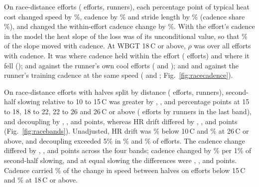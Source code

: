 \documentclass[12pt]{article}
\newcommand{\degC}{\,\textdegree C}
\begin{document}
On race-distance efforts (\raceWithinN{} efforts, \raceWithinRunners{} runners), each percentage point of typical heat cost changed speed by \raceSpeed\%, cadence by \raceCad\% and stride length by \raceStride\% (cadence share \raceCadShare\%), and changed the within-effort cadence change by \raceCadDrift\%. With the effort's cadence in the model the heat slope of the loss was \raceCondSlope{} of its unconditional value, so that \raceCondShare\% of the slope moved with cadence. At WBGT 18\degC{} or above, $\rho$ was \rhoAll{} over all \rhoAllN{} efforts with cadence. It was \rhoRaceHeld{} where cadence held within the effort (\rhoRaceHeldN{} efforts) and \rhoRaceFell{} where it fell (\rhoRaceFellN); \rhoCoolHeld{} and \rhoCoolDown{} against the runner's own cool efforts (\rhoCoolHeldN{} and \rhoCoolDownN); and \rhoTrainHeld{} and \rhoTrainDown{} against the runner's training cadence at the same speed (\rhoTrainHeldN{} and \rhoTrainDownN; Fig.~\ref{fig:racecadence}).

On race-distance efforts with halves split by distance (\raceBandN{} efforts, \raceBandRunners{} runners), second-half slowing relative to 10 to 15\degC{} was greater by \raceBandSlowMild, \raceBandSlowWarm, \raceBandSlowHot{} and \raceBandSlowSevere{} percentage points at 15 to 18, 18 to 22, 22 to 26 and 26\degC{} or above (\raceBandSevereN{} efforts by \raceBandSevereRunners{} runners in the last band), and decoupling by \raceBandDecMild, \raceBandDecWarm, \raceBandDecHot{} and \raceBandDecSevere{} points, whereas HR drift differed by \raceBandHRMild, \raceBandHRWarm, \raceBandHRHot{} and \raceBandHRSevere{} points (Fig.~\ref{fig:racebands}). Unadjusted, HR drift was \raceRawHRCold\% below 10\degC{} and \raceRawHRSevere\% at 26\degC{} or above, and decoupling exceeded 5\% in \raceRawOverFiveCold\% and \raceRawOverFiveSevere\% of efforts. The cadence change differed by \raceBandCadMild, \raceBandCadWarm, \raceBandCadHot{} and \raceBandCadSevere{} points across the four bands; cadence changed by \raceBandCadPerSlow\% per 1\% of second-half slowing, and at equal slowing the differences were \raceBandCadFixedMild, \raceBandCadFixedWarm, \raceBandCadFixedHot{} and \raceBandCadFixedSevere{} points. Cadence carried \raceHalfShareCool\% of the change in speed between halves on efforts below 15\degC{} and \raceHalfShareHot\% at 18\degC{} or above.
\end{document}
